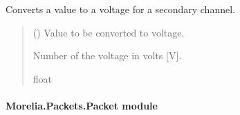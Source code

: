 \documentclass[letterpaper,10pt,english]{sphinxmanual}
\begin{document}
\begin{fulllineitems}
\begin{fulllineitems}
\label{\detokenize{Morelia.Packets:Morelia.Packets.Binary5.PacketBinary5._Voltage_SecondaryChannels}}
\pysigstartsignatures
{}
\pysigstopsignatures
\sphinxAtStartPar
Converts a value to a voltage for a secondary channel.
\begin{quote}\begin{description}
\sphinxAtStartPar
{} () \textendash{} Value to be converted to voltage.

\sphinxAtStartPar
Number of the voltage in volts {[}V{]}.

\sphinxAtStartPar
float

\end{description}\end{quote}

\end{fulllineitems}


\end{fulllineitems}



\paragraph{Morelia.Packets.Packet module}
\label{\detokenize{Morelia.Packets:module-Morelia.Packets.Packet}}\label{\detokenize{Morelia.Packets:morelia-packets-packet-module}}
\end{document}
